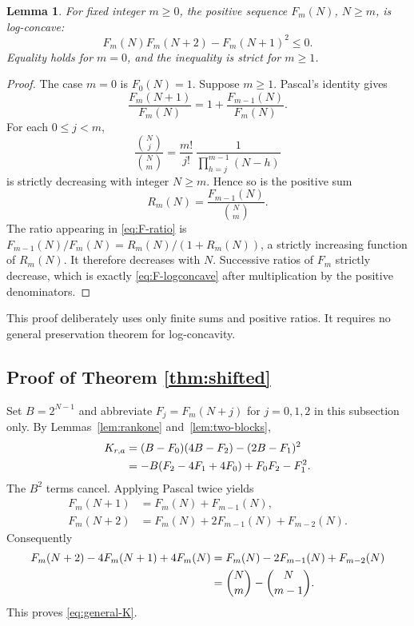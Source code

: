 \documentclass[11pt,a4paper]{article}
\newtheorem{lemma}[theorem]{Lemma}
\theoremstyle{definition}
\numberwithin{equation}{section}
\begin{document}
\begin{lemma}
\label{lem:F-logconcave}
For fixed integer $m\ge0$, the positive sequence $F_m(N)$, $N\ge m$,
is log-concave:
\begin{equation}
 F_m(N)F_m(N+2)-F_m(N+1)^2\le0.
 \label{eq:F-logconcave}
\end{equation}
Equality holds for $m=0$, and the inequality is strict for $m\ge1$.
\end{lemma}
\begin{proof}
The case $m=0$ is $F_0(N)=1$. Suppose $m\ge1$. Pascal's identity gives
\begin{equation}
 \frac{F_m(N+1)}{F_m(N)}
 =1+\frac{F_{m-1}(N)}{F_m(N)}.
 \label{eq:F-ratio}
\end{equation}
For each $0\le j<m$,
\begin{equation}
 \frac{\binom Nj}{\binom Nm}
 =\frac{m!}{j!}\,
   \frac{1}{\prod_{h=j}^{m-1}(N-h)}
 \label{eq:binom-ratio}
\end{equation}
is strictly decreasing with integer $N\ge m$. Hence so is the positive
sum
\[
 R_m(N)=\frac{F_{m-1}(N)}{\binom Nm}.
\]
The ratio appearing in \eqref{eq:F-ratio} is
$F_{m-1}(N)/F_m(N)=R_m(N)/(1+R_m(N))$, a strictly increasing function of
$R_m(N)$. It therefore decreases with $N$. Successive ratios of $F_m$
strictly decrease, which is exactly \eqref{eq:F-logconcave} after
multiplication by the positive denominators.
\end{proof}

This proof deliberately uses only finite sums and positive ratios. It
requires no general preservation theorem for log-concavity.

\subsection{Proof of Theorem \ref{thm:shifted}}

Set $B=2^{N-1}$ and abbreviate $F_j=F_m(N+j)$ for $j=0,1,2$ in this
subsection only. By Lemmas~\ref{lem:rankone} and~\ref{lem:two-blocks},
\begin{align}
 K_{r,a}
   &=(B-F_0)(4B-F_2)-(2B-F_1)^2\notag\\
   &=-B(F_2-4F_1+4F_0)+F_0F_2-F_1^2.
 \label{eq:K-expand}
\end{align}
The $B^2$ terms cancel. Applying Pascal twice yields
\begin{align*}
 F_m(N+1)&=F_m(N)+F_{m-1}(N),\\
 F_m(N+2)&=F_m(N)+2F_{m-1}(N)+F_{m-2}(N).
\end{align*}
Consequently
\begin{align}
 F_m(N+2)-4F_m(N+1)+4F_m(N)
  &=F_m(N)-2F_{m-1}(N)+F_{m-2}(N)\notag\\
  &=\binom Nm-\binom N{m-1}.
 \label{eq:tail-cancellation}
\end{align}
This proves \eqref{eq:general-K}.
\end{document}
